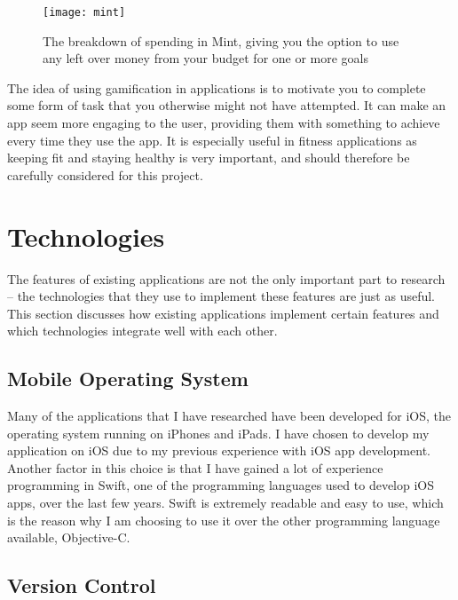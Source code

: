 \begin{figure}[hbt]
  \centering
  \texttt{[image: mint]}
  \caption{The breakdown of spending in Mint, giving you the option to use any left over money from your budget for one or more goals \cite{IntuitInc.a}}
  \label{fig:mint}
\end{figure}

The idea of using gamification in applications is to motivate you to complete some form of task that you otherwise might not have attempted. It can make an app seem more engaging to the user, providing them with something to achieve every time they use the app. It is especially useful in fitness applications as keeping fit and staying healthy is very important, and should therefore be carefully considered for this project.


\section{Technologies} \label{section:technologies}

The features of existing applications are not the only important part to research -- the technologies that they use to implement these features are just as useful. This section discusses how existing applications implement certain features and which technologies integrate well with each other.

\subsection{Mobile Operating System}

Many of the applications that I have researched have been developed for iOS, the operating system running on iPhones and iPads. I have chosen to develop my application on iOS due to my previous experience with iOS app development. Another factor in this choice is that I have gained a lot of experience programming in Swift, one of the programming languages used to develop iOS apps, over the last few years. Swift is extremely readable and easy to use, which is the reason why I am choosing to use it over the other programming language available, Objective-C.

\subsection{Version Control} \label{subsection:version-control}

